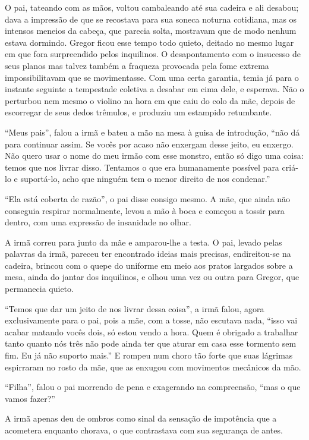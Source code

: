 O pai, tateando com as mãos, voltou cambaleando até sua cadeira e ali
desabou; dava a impressão de que se recostava para sua soneca noturna
cotidiana, mas os intensos meneios da cabeça, que parecia solta, mostravam
que de modo nenhum estava dormindo. Gregor ficou esse tempo todo quieto,
deitado no mesmo lugar em que fora surpreendido pelos inquilinos. O
desapontamento com o insucesso de seus planos mas talvez também a fraqueza
provocada pela fome extrema impossibilitavam que se movimentasse. Com uma
certa garantia, temia já para o instante seguinte a tempestade coletiva a
desabar em cima dele, e esperava. Não o perturbou nem mesmo o violino na
hora em que caiu do colo da mãe, depois de escorregar de seus dedos
trêmulos, e produziu um estampido retumbante.

“Meus pais”, falou a irmã e bateu a mão na mesa à guisa de introdução,
“não dá para continuar assim. Se vocês por acaso não enxergam desse jeito,
eu enxergo. Não quero usar o nome do meu irmão com esse monstro, então só
digo uma coisa: temos que nos livrar disso. Tentamos o que era humanamente
possível para criá-lo e suportá-lo, acho que ninguém tem o menor direito
de nos condenar.”

“Ela está coberta de razão”, o pai disse consigo mesmo. A mãe, que ainda
não conseguia respirar normalmente, levou a mão à boca e começou a tossir
para dentro, com uma expressão de insanidade no olhar.

A irmã correu para junto da mãe e amparou-lhe a testa. O pai, levado pelas
palavras da irmã, pareceu ter encontrado ideias mais precisas,
endireitou-se na cadeira, brincou com o quepe do uniforme em meio aos
pratos largados sobre a mesa, ainda do jantar dos inquilinos, e olhou uma
vez ou outra para Gregor, que permanecia quieto.

“Temos que dar um jeito de nos livrar dessa coisa”, a irmã falou, agora
exclusivamente para o pai, pois a mãe, com a tosse, não escutava nada,
“isso vai acabar matando vocês dois, só estou vendo a hora. Quem é
obrigado a trabalhar tanto quanto nós três não pode ainda ter que aturar
em casa esse tormento sem fim. Eu já não suporto mais.” E rompeu num choro
tão forte que suas lágrimas espirraram no rosto da mãe, que as enxugou com
movimentos mecânicos da mão.

“Filha”, falou o pai morrendo de pena e exagerando na compreensão, “mas o
que vamos fazer?”

A irmã apenas deu de ombros como sinal da sensação de impotência que a
acometera enquanto chorava, o que contrastava com sua segurança de antes.

